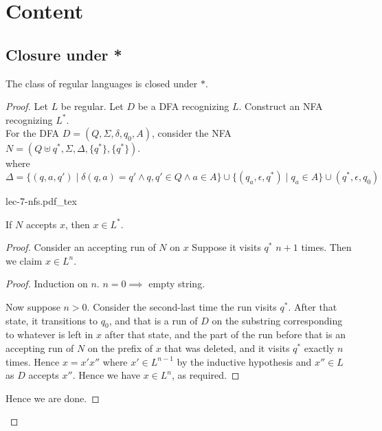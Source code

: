 \documentclass[a4paper]{article}
\newcommand{\incfig}[1]{%
    \def\svgwidth{\columnwidth}
    {#1.pdf_tex}
}
\begin{document}
\section{Content}

\subsection{Closure under *}

\begin{theorem}
    The class of regular languages is closed under $*$.
\end{theorem}

\begin{proof}
    Let $L$ be regular. Let $D$ be a DFA recognizing $L$. Construct an NFA recognizing $L^*$.\\

    For the DFA $D = (Q, \Sigma, \delta, q_0, A)$, consider the NFA $N = (Q \uplus q^*, \Sigma, \Delta, \{q^*\}, \{q^*\})$.\\

    where $$\Delta = \{(q, a, q') \mid \delta(q, a) = q' \land q, q' \in Q \land a \in A\} \cup \{(q_a, \epsilon, q^*) \mid q_a \in A\} \cup (q^*, \epsilon, q_0)$$

    
    {
        \centering
        \incfig{lec-7-nfs}
    }

    \begin{claim}
        If $N$ accepts $x$, then $x \in L^*$.
    \end{claim}

    \begin{proof}
        Consider an accepting run of $N$ on $x$ Suppose it visits $q^*$ $n + 1$ times. Then we claim $x \in L^n$.
        \begin{proof}
            Induction on $n$.
            $n = 0 \implies$ empty string.

            Now suppose $n > 0$. Consider the second-last time the run visits $q^*$. After that state, it transitions to $q_0$, and that is a run of $D$ on the substring corresponding to whatever
            is left in $x$ after that state, and the part of the run before that is an accepting run of $N$ on the prefix of $x$ that was deleted, and it visits $q^*$ exactly $n$ times. Hence $x = x'x''$
            where $x' \in L^{n-1}$ by the inductive hypothesis and $x'' \in L$ as $D$ accepts $x''$. Hence we have $x \in L^n$, as required.
        \end{proof}
        Hence we are done.
    \end{proof}


\end{proof}
\end{document}
